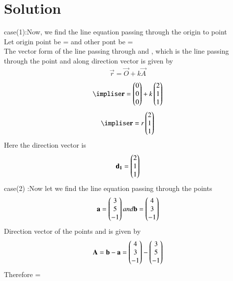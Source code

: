 \documentclass[journal,12pt,twocolumn]{IEEEtran}
\begin{document}
\section{Solution}
case(1):Now, we find the line equation passing through the origin to point 
\\
Let origin point be = and other pont be =
\\ 
The vector form of the line passing through  and , which is the line passing through the point  and along direction vector  is given by 
\begin{align}
\vec{r}=\vec{O}+k\vec{A}
\end{align}
\begin{align}
\implise \vec{r}=\myvec{0\\0\\0}+k\myvec{2\\1\\1}
\end{align}
\begin{align}
\implise \vec{r}=r\myvec{2\\1\\1}
\end{align}
Here the direction vector is 
\begin{align}
\mathbf{d_1}=\begin{pmatrix}2\\1\\1\end{pmatrix}
\end{align}
case(2) :Now let we find the line equation passing through the points
\begin{align}
\mathbf{a}=\begin{pmatrix}3\\5\\-1\end{pmatrix} and \mathbf{b}=\begin{pmatrix}4\\3\\-1\end{pmatrix}
\end{align}
Direction vector  of the points  and  is given by 
\begin{align}
\mathbf{A}=\mathbf{b}-\mathbf{a}
=\begin{pmatrix}4\\3\\-1\end{pmatrix}-\begin{pmatrix}3\\5\\-1\end{pmatrix}
\end{align}
Therefore =
\end{document}
